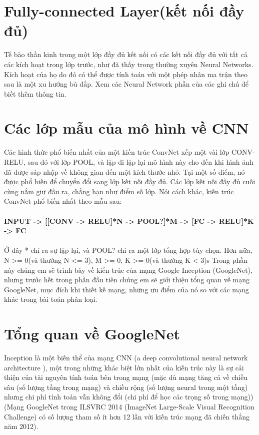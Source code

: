 \documentclass[a4paper,12pt]{report}
\begin{document}
\section{Fully-connected Layer(kết nối đầy đủ)}
Tế bào thần kinh trong một lớp đầy đủ kết nối có các kết nối đầy đủ với tất cả các kích hoạt trong lớp trước, như đã thấy trong thường xuyên Neural Networks. Kích hoạt của họ do đó có thể được tính toán với một phép nhân ma trận theo sau là một xu hướng bù đắp. Xem các Neural Network phần của các ghi chú để biết thêm thông tin.
\section{Các lớp mẫu của mô hình về CNN}
Các hình thức phổ biến nhất của một kiến trúc ConvNet xếp một vài lớp CONV-RELU, sau đó với lớp POOL, và lặp đi lặp lại mô hình này cho đến khi hình ảnh đã được sáp nhập về không gian đến một kích thước nhỏ. Tại một số điểm, nó được phổ biến để chuyển đổi sang lớp kết nối đầy đủ. Các lớp kết nối đầy đủ cuối cùng nắm giữ đầu ra, chẳng hạn như điểm số lớp. Nói cách khác, kiến trúc ConvNet phổ biến nhất theo mẫu sau: \\
\\
\small{
\textbf{INPUT -> [[CONV -> RELU]*N -> POOL?]*M -> [FC -> RELU]*K -> FC}
}
\\ \\
Ở đây * chỉ ra sự lặp lại, và POOL? chỉ ra một lớp tổng hợp tùy chọn. Hơn nữa, N >= 0(và thường N <= 3), M >= 0, K >= 0(và thường K < 3)s
Trong phần này chúng em sẽ trình bày về kiến trúc của mạng Google Inception (GoogleNet), nhưng trước hết trong phần đầu tiên chúng em sẽ giới thiệu tổng quan về mạng GoogleNet, mục đích khi thiết kế mạng, những ưu điểm của nó so với các mạng khác trong bài toán phân loại.

\section{Tổng quan về GoogleNet}
Inception là một biến thể của mạng CNN (a deep convolutional neural network architecture \cite{googlenet}), một trong những khác biệt lớn nhất của kiến trúc này là sự cải thiện của tài nguyên tính toán bên trong mạng (mặc dù mạng tăng cả về chiều sâu (số lượng tầng trong mạng) và chiều rộng (số lượng neural trong một tầng) nhưng chi phí tính toán vẫn không đổi (chi phí để học các trọng số trong mạng)) (Mạng GoogleNet trong ILSVRC 2014 (ImageNet Large-Scale Visual Recognition Challenge) có số lượng tham số ít hơn 12 lần với kiến trúc mạng đã chiến thắng năm 2012). 
\end{document}
